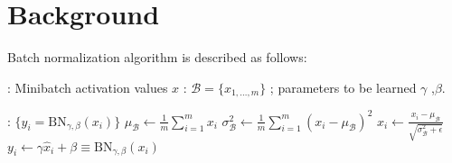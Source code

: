 
\chapter{Background} %

\label{ChapterX} %
Batch normalization algorithm is described as follows:



\vspace*{1.3\baselineskip}
\begin{algorithmic}[1]

\REQUIRE : Minibatch activation values $x$ : $\mathcal B = \{x_{1,\ldots,m}\}$ ; parameters to be learned $\gamma$ ,$\beta$.

\ENSURE  : $\{y_i = \mathrm{BN}_{\gamma,\beta}(x_i)\}$
\vspace*{.7\baselineskip}
\STATE $\mu_{\mathcal B} \leftarrow \frac1m \sum_{i = 1}^m x_i$
\vspace*{.7\baselineskip}
\STATE $\sigma^2_{\mathcal B} \leftarrow \frac1m \sum_{i=1}^m (x_i - \mu_{\mathcal B})^2$
\vspace*{.7\baselineskip}
\STATE $\hat x_i \leftarrow \frac{x_i - \mu_{\mathcal B}}{\sqrt{\sigma_{\mathcal B}^2 + \epsilon}}$
\vspace*{.7\baselineskip}
\STATE $y_i \leftarrow \gamma \hat x_i + \beta \equiv \mathrm{BN}_{\gamma,\beta}(x_i)$

\end{algorithmic}